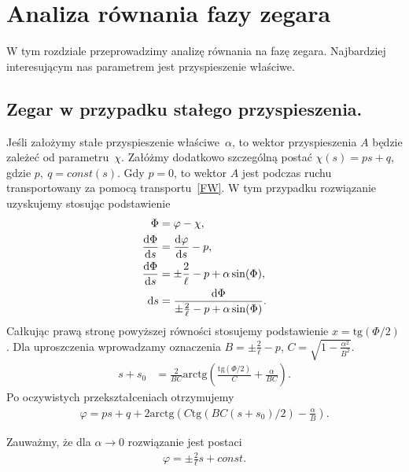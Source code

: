 \newpage
\section{Analiza równania fazy zegara}
W tym rozdziale przeprowadzimy analizę równania na fazę zegara.
Najbardziej interesującym nas parametrem jest przyspieszenie właściwe.

\subsection{Zegar w przypadku stałego przyspieszenia.}
Jeśli założymy stałe przyspieszenie właściwe~$\alpha$, to wektor 
przyspieszenia $A$ będzie zależeć od parametru~$\chi$.
Załóżmy dodatkowo szczególną postać $\chi (s) = p s + q$, 
gdzie $p,\ q = const(s)$.  Gdy $p=0$, to wektor $A$ jest podczas ruchu
transportowany za pomocą transportu~\eqref{FW}.  
W tym przypadku rozwiązanie uzyskujemy stosując  
podstawienie
\begin{align} \label{analiza_podstawienie1}
\Phi &= \varphi - \chi,\\
\frac{\text{d} \Phi}{\text{d} s} &= \frac{\text{d} \varphi }{\text{d} s} - p,  \nonumber \\
\frac{\text{d} \Phi}{\text{d} s} &= \pm \frac{2}{\ell} - p  + 
\alpha \sin (\Phi ) ,  \nonumber \\
\text{d} s & = \frac{\text{d} \Phi}{ \pm \frac{2}{\ell} - p  + 
\alpha \sin (\Phi ) } . \nonumber
\end{align}
Całkując prawą stronę powyższej równości stosujemy podstawienie
 $ x = \text{tg} (\Phi/2)$. Dla uproszczenia wprowadzamy oznaczenia
$B = \pm \frac{2}{\ell} - p $,
$C =  \sqrt{ 1 - \frac{\alpha^2}{B^2}}$. 
\begin{align*}
s +s_0 & = \frac{2}{BC} \text{arctg}  
\left( \frac{ \text{tg} (\Phi/2)}{C} +\frac{\alpha}{BC} \right).
\end{align*}
Po oczywistych przekształceniach otrzymujemy 
\begin{align*}
\varphi = ps + q + 
2\text{arctg} \left( 
C \text{tg} \left( BC(s + s_0)/2\right)  - \frac{\alpha}{B}
\right) .
\end{align*}

Zauważmy, że dla $\alpha \to 0$ rozwiązanie jest 
postaci
\begin{align}\nonumber
\varphi = \pm \frac{2}{\ell} s + const.
\end{align}

